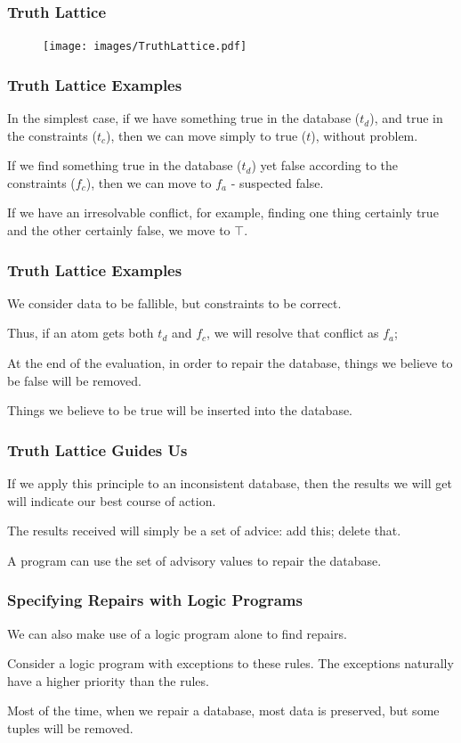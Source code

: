\begin{frame}
\frametitle{Truth Lattice}

\begin{figure}[!h]
  \centering \texttt{[image: images/TruthLattice.pdf]}
\end{figure}


\end{frame}

\begin{frame}
\frametitle{Truth Lattice Examples}

In the simplest case, if we have something true in the database ($t_d$), and true in the constraints ($t_c$), then we can move simply to true ($t$), without problem. 

If we find something true in the database ($t_d$) yet false according to the constraints ($f_c$), then we can move to $f_a$ - suspected false. 

If we have an irresolvable conflict, for example, finding one thing certainly true and the other certainly false, we move to $\top$.

\end{frame}

\begin{frame}
\frametitle{Truth Lattice Examples}

We consider data to be fallible, but constraints to be correct.

Thus, if an atom gets both $t_d$ and $f_c$, we will resolve that conflict as $f_a$; 
 
 At the end of the evaluation, in order to repair the database, things we believe to 
be false will be removed.

Things we believe to be true will be inserted into the database.

\end{frame}

\begin{frame}
\frametitle{Truth Lattice Guides Us}

If we apply this principle to an inconsistent database, then the results we will get will indicate our best course of action. 

The results received will simply be a set of advice: add this; delete that.

A program can use the set of advisory values to repair the database.


\end{frame}


\begin{frame}
\frametitle{Specifying Repairs with Logic Programs}

We can also make use of a logic program alone to find repairs.

Consider a logic program with exceptions to these rules. The exceptions naturally have a higher priority than the rules.

Most of the time, when we repair a database, most data is preserved, but some tuples will be removed. 

\end{frame}


